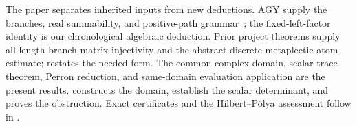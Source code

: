 The paper separates inherited inputs from new deductions.  AGY supply the
branches, real summability, and positive-path grammar~\citep{agy2006}; the
fixed-left-factor identity is our chronological algebraic deduction.  Prior
project theorems supply all-length branch
matrix injectivity and the abstract discrete-metaplectic atom estimate;
 restates the needed form.  The common complex
domain, scalar trace theorem, Perron reduction, and same-domain evaluation
application are the present results.   constructs
the domain,  establish the scalar
determinant, and  proves the obstruction.  Exact
certificates and the Hilbert--P\'olya assessment follow in
.
